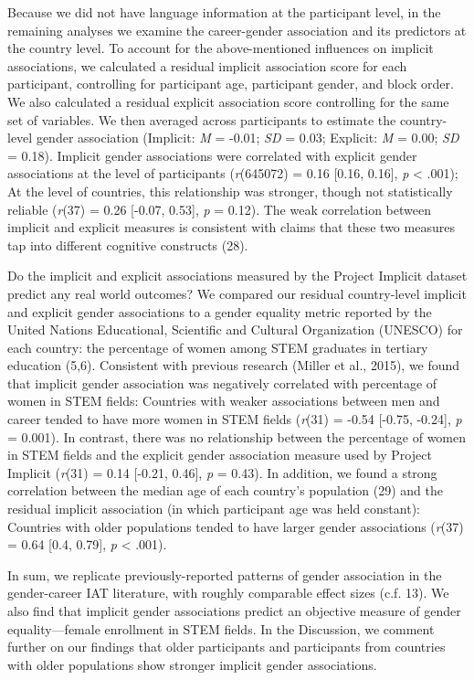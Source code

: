 \documentclass[9pt,twocolumn]{pnas-new}
\begin{document}
Because we did not have language information at the participant level, in the remaining analyses we examine the career-gender association and its predictors at the country level. To account for the above-mentioned influences on implicit associations, we calculated a residual implicit association score for each participant, controlling for participant age, participant gender, and block order. We also calculated a residual explicit association score controlling for the same set of variables. We then averaged across participants to estimate the country-level gender association (Implicit: \emph{M} = -0.01; \emph{SD} = 0.03; Explicit: \emph{M} = 0.00; \emph{SD} = 0.18). Implicit gender associations were correlated with explicit gender associations at the level of participants (\emph{r}(645072) = 0.16 {[}0.16, 0.16{]}, \emph{p} \textless{} .001); At the level of countries, this relationship was stronger, though not statistically reliable (\emph{r}(37) = 0.26 {[}-0.07, 0.53{]}, \emph{p} = 0.12). The weak correlation between implicit and explicit measures is consistent with claims that these two measures tap into different cognitive constructs (28).

Do the implicit and explicit associations measured by the Project Implicit
dataset predict any real world outcomes? We compared our residual
country-level implicit and explicit gender associations to a gender equality
metric reported by the United Nations Educational, Scientific and
Cultural Organization (UNESCO) for each country: the percentage of women
among STEM graduates in tertiary education  (5,6).  Consistent with previous research
(Miller et al., 2015), we found that implicit gender association was negatively
correlated with percentage of women in STEM fields: Countries with
weaker associations between men and career tended to have more women in STEM fields (\emph{r}(31) = -0.54 {[}-0.75, -0.24{]}, \emph{p} = 0.001). In contrast, there was no
relationship between the percentage of women in STEM fields and the
explicit gender association measure used by Project Implicit (\emph{r}(31) = 0.14 {[}-0.21, 0.46{]}, \emph{p} = 0.43). In addition, we found a strong correlation between the
median age of each country's population (29) and the residual implicit association (in which participant age
was held constant): Countries with older populations tended to have
larger gender associations (\emph{r}(37) = 0.64 {[}0.4, 0.79{]}, \emph{p} \textless{} .001).


In sum, we replicate previously-reported patterns of gender association in the
gender-career IAT literature, with roughly comparable effect sizes (c.f. 13). We also find that implicit gender associations predict an objective measure of gender equality---female enrollment in STEM fields. In the Discussion, we comment further on our findings that older participants and participants from countries with older populations show stronger implicit gender associations.
\end{document}
